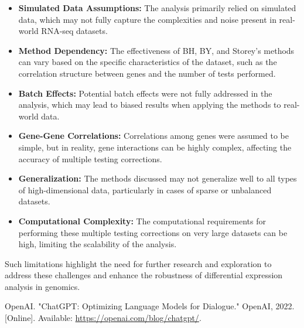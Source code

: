 \documentclass[12pt]{article}
\begin{document}
\begin{itemize}
    \item \textbf{Simulated Data Assumptions:} The analysis primarily relied on simulated data, which may not fully capture the complexities and noise present in real-world RNA-seq datasets.
    \item \textbf{Method Dependency:} The effectiveness of BH, BY, and Storey’s methods can vary based on the specific characteristics of the dataset, such as the correlation structure between genes and the number of tests performed.
    \item \textbf{Batch Effects:} Potential batch effects were not fully addressed in the analysis, which may lead to biased results when applying the methods to real-world data.
    \item \textbf{Gene-Gene Correlations:} Correlations among genes were assumed to be simple, but in reality, gene interactions can be highly complex,\cite{reiner2003multiple} affecting the accuracy of multiple testing corrections.
    \item \textbf{Generalization:} The methods discussed may not generalize well to all types of high-dimensional data, particularly in cases of sparse or unbalanced datasets.
    \item \textbf{Computational Complexity:} The computational requirements for performing these multiple testing corrections on very large datasets can be high, limiting the scalability of the analysis.
\end{itemize}
Such limitations  highlight the need for further research and exploration to address these challenges and enhance the robustness of differential expression analysis in genomics.

\printbibliography
{} OpenAI. "ChatGPT: Optimizing Language Models for Dialogue." OpenAI, 2022. [Online]. Available: \url{https://openai.com/blog/chatgpt/}.
\end{document}
